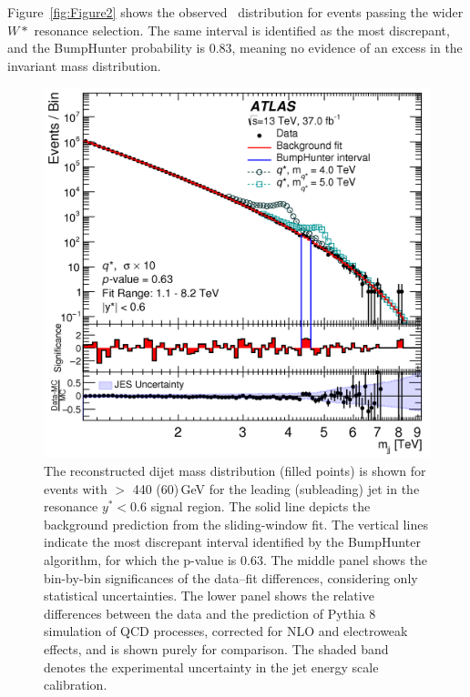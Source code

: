 Figure~\ref{fig:Figure2} shows the observed \mjj~distribution for events passing the wider $W*$ resonance selection.  The same interval is identified as the most discrepant, and the BumpHunter probability is 0.83, meaning no evidence of an excess in the invariant mass distribution.

\begin{figure}[]
	\centering
	\includegraphics[width=0.8\columnwidth]{figures/Results/Figure1.png}
	\caption{ The reconstructed dijet mass distribution \mjj (filled points) is shown for events with \pt $>$ 440 (60)\,GeV for the leading (subleading) jet in the resonance $y^*<0.6$ signal region. The solid line depicts the background prediction from the sliding-window fit. The vertical lines indicate the most discrepant interval identified by the BumpHunter algorithm, for which the p-value is 0.63. The middle panel shows the bin-by-bin significances of the data–fit differences, considering only statistical uncertainties. The lower panel shows the relative differences between the data and the prediction of Pythia 8 simulation of QCD processes, corrected for NLO and electroweak effects, and is shown purely for comparison. The shaded band denotes the experimental uncertainty in the jet energy scale calibration.}
	\label{fig:Figure1}
\end{figure}

